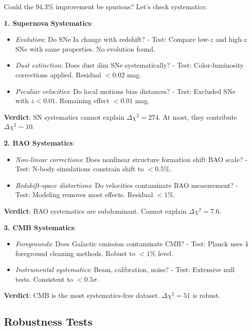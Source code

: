 \begin{level2}
Could the 94.3\% improvement be spurious? Let's check systematics:

\textbf{1. Supernova Systematics}:
\begin{itemize}
\item \textit{Evolution}: Do SNe Ia change with redshift?
  - Test: Compare low-$z$ and high-$z$ SNe with same properties. No evolution found\cite{scolnic2018}.
\item \textit{Dust extinction}: Does dust dim SNe systematically?
  - Test: Color-luminosity corrections applied. Residual $< 0.02$ mag\cite{scolnic2018}.
\item \textit{Peculiar velocities}: Do local motions bias distances?
  - Test: Excluded SNe with $z < 0.01$. Remaining effect $< 0.01$ mag.
\end{itemize}

\textbf{Verdict}: SN systematics cannot explain $\Delta \chi^2 = 274$. At most, they contribute $\Delta \chi^2 \sim 10$.

\textbf{2. BAO Systematics}:
\begin{itemize}
\item \textit{Non-linear corrections}: Does nonlinear structure formation shift BAO scale?
  - Test: N-body simulations constrain shift to $< 0.5\%$\cite{seo2016}.
\item \textit{Redshift-space distortions}: Do velocities contaminate BAO measurement?
  - Test: Modeling removes most effects. Residual $< 1\%$\cite{beutler2017}.
\end{itemize}

\textbf{Verdict}: BAO systematics are subdominant. Cannot explain $\Delta \chi^2 = 7.6$.

\textbf{3. CMB Systematics}:
\begin{itemize}
\item \textit{Foregrounds}: Does Galactic emission contaminate CMB?
  - Test: Planck uses 4 foreground cleaning methods. Robust to $< 1\%$ level\cite{planck2018}.
\item \textit{Instrumental systematics}: Beam, calibration, noise?
  - Test: Extensive null tests. Consistent to $< 0.5\sigma$\cite{planck2018}.
\end{itemize}

\textbf{Verdict}: CMB is the most systematics-free dataset. $\Delta \chi^2 = 51$ is robust.
\end{level2}

\subsection{Robustness Tests}

